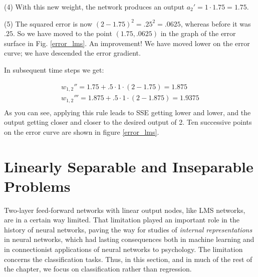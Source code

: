 (4) With this new weight, the network produces an output  $a_2' = 1 \cdot 1.75 = 1.75$. 

(5) The squared error is now $(2-1.75)^2=.25^2=.0625$, whereas before it was $.25$. So we have moved to the point $(1.75,.0625)$ in the graph  of the error surface in Fig. \ref{error_lms}. An improvement!  We have moved lower on the error curve; we have descended the error gradient.

In subsequent time steps we get:

\begin{eqnarray*}
w_{1,2}'' = 1.75 + .5 \cdot 1 \cdot (2 - 1.75) = 1.875 \\
w_{1,2}''' = 1.875 + .5 \cdot 1 \cdot (2 - 1.875) = 1. 9375 \\
\end{eqnarray*}
As you can see, applying this rule leads to SSE getting lower and lower, and the output getting closer and closer to the desired output of 2. Ten successive points on the error curve are shown in figure \ref{error_lms}.

\section{Linearly Separable and Inseparable Problems}
\label{linearlySeparable}


Two-layer feed-forward networks with linear output nodes, like LMS networks, are in a certain way limited. That limitation played  an important role in the history of neural networks, paving the way for studies of \emph{internal representations} in neural networks, which had lasting consequences both in machine learning and in connectionist applications of neural networks to psychology.  The limitation concerns the  classification tasks. Thus, in this section, and in much of the rest of the chapter, we focus on classification rather than regression.

